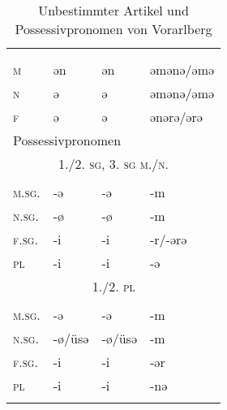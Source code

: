
\begin{table}[H]
	\caption{Unbestimmter Artikel und Possessivpronomen von Vorarlberg \citep[269-270, 274-276]{Jutz1925}}\label{table109}
	\begin{tabular}{llll}
		\lsptoprule
		\multicolumn{4}{l}{unbestimmter Artikel}\\
		& \NOM & \AKK & \DAT\\\midrule
		\textsc{m} & ən & ən & əmənə/əmə\\
		\textsc{n} & ə & ə & əmənə/əmə\\
		\textsc{f} & ə & ə & ənərə/ərə\\ \midrule
		\multicolumn{4}{l}{Possessivpronomen}\\
		\multicolumn{4}{c}{\scshape 1./2. \textsc{sg}, 3. \textsc{sg} m./n.} \\\cmidrule(lr){1-4}
		& \NOM & \AKK & \DAT\\\midrule
		\textsc{m.sg.} & {}-ə & {}-ə & {}-m\\
		\textsc{n.sg.} & {}-ø & {}-ø & {}-m\\
		\textsc{f.sg.} & {}-i & {}-i & {}-r/-ərə\\
		\textsc{pl} & {}-i & {}-i & {}-ə\\ \midrule
		\multicolumn{4}{c}{\scshape 1./2. \textsc{pl}} \\\cmidrule(lr){1-4}
		& \NOM & \AKK & \DAT\\\midrule
		\textsc{m.sg.} & {}-ə & {}-ə & {}-m\\
		\textsc{n.sg.} & {}-ø/üsə & {}-ø/üsə & {}-m\\
		\textsc{f.sg.} & {}-i & {}-i & {}-ər\\
		\textsc{pl} & {}-i & {}-i & {}-nə\\
		\lspbottomrule
	\end{tabular}
\end{table}


